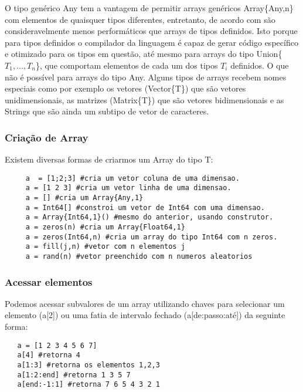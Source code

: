  O tipo genérico Any tem a vantagem de permitir arrays genéricos Array\{Any,n\} com elementos de quaisquer tipos diferentes, entretanto, de acordo com \cite{Lobianco2019} são consideravelmente menos performáticos que arrays de tipos definidos. Isto porque para tipos definidos o compilador da linguagem é capaz de gerar código específico e otimizado para os tipos em questão, até mesmo para arrays do tipo Union\{$T_1,...,T_n$\}, que comportam elementos de cada um dos tipos $T_i$ definidos. O que não é possível para arrays do tipo Any.  
 Alguns tipos de arrays recebem nomes especiais como por exemplo os vetores (Vector\{T\}) que são vetores unidimensionais, as matrizes (Matrix\{T\}) que são vetores bidimensionais e as Strings que são ainda um subtipo de vetor de caracteres. 


\subsubsection{Criação de Array}
Existem diversas formas de criarmos um Array do tipo T:
\begin{lstlisting}
     a  = [1;2;3] #cria um vetor coluna de uma dimensao.
     a = [1 2 3] #cria um vetor linha de uma dimensao.
     a = [] #cria um Array{Any,1}
     a = Int64[] #constroi um vetor de Int64 com uma dimensao.
     a = Array{Int64,1}() #mesmo do anterior, usando construtor.
     a = zeros(n) #cria um Array{Float64,1}
     a = zeros(Int64,n) #cria um array do tipo Int64 com n zeros.
     a = fill(j,n) #vetor com n elementos j
     a = rand(n) #vetor preenchido com n numeros aleatorios
\end{lstlisting}

\subsubsection{Acessar elementos}
Podemos acessar subvalores de um array utilizando chaves para selecionar um elemento (a[2]) ou uma fatia de intervalo fechado (a[de:passo:até]) da seguinte forma:
\begin{lstlisting}
   a = [1 2 3 4 5 6 7] 
   a[4] #retorna 4
   a[1:3] #retorna os elementos 1,2,3
   a[1:2:end] #retorna 1 3 5 7
   a[end:-1:1] #retorna 7 6 5 4 3 2 1
\end{lstlisting}

